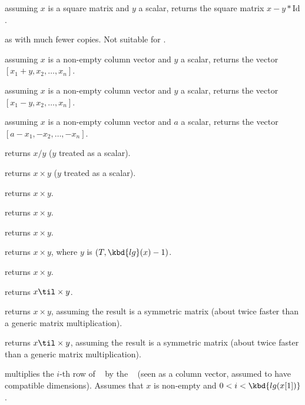  assuming $x$ is a square matrix
and $y$ a scalar, returns the square matrix $x - y*\text{Id}$.

 as  with much
fewer copies. Not suitable for .

 assuming $x$ is a non-empty column vector
and $y$ a scalar, returns the vector $[x_1 + y, x_2,\dots,x_n]$.

 assuming $x$ is a non-empty column vector
and $y$ a scalar, returns the vector $[x_1 - y, x_2,\dots,x_n]$.

 assuming $x$ is a non-empty column vector
and $a$ a scalar, returns the vector $[a - x_1, -x_2,\dots,-x_n]$.


 returns $x/y$ ($y$ treated as a scalar).



 returns $x\times y$ ($y$ treated as a
scalar).

 returns $x\times y$.

 returns $x\times y$.

 returns $x\times y$.

 returns $x \times y$, where $y$
is $(T, \kbd{lg}(x)-1)$.

 returns $x\times y$.

 returns $x\til \times y$.

 returns $x\times y$, assuming
the result is a symmetric matrix (about twice faster than a generic matrix
multiplication).

 returns $x\til \times y$, assuming
the result is a symmetric matrix (about twice faster than a generic matrix
multiplication).

 multiplies the $i$-th row of
~ by the ~ (seen as a column vector, assumed
to have compatible dimensions). Assumes that $x$ is non-empty and $0 < i <
\kbd{lg(x[1])}$.

